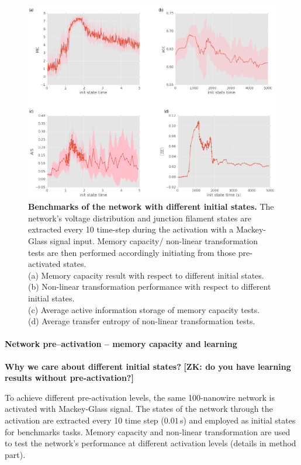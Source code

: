 \documentclass[fleqn,10pt,  reprint, amsmath,amssymb,aps, floatfix]{wlscirep}
\begin{document}
\begin{figure}[]
	\centering
	\includegraphics[width=1\linewidth]{figure/benchmark.png}
	\caption{\textbf{Benchmarks of the network with different initial states.} The network's voltage distribution and junction filament states are extracted every 10 time-step during the activation with a Mackey-Glass signal input. Memory capacity/ non-linear transformation tests are then performed accordingly initiating from those pre-activated states. \\
	(a) Memory capacity result with respect to different initial states.\\
	(b) Non-linear transformation performance with respect to different initial states.\\
	(c) Average active information storage of memory capacity tests.\\
	(d) Average transfer entropy of non-linear transformation tests.} 
	\label{fig:benchmark}
\end{figure}

\paragraph{Network pre--activation -- memory capacity and learning}

\textbf{Why we care about different initial states?} 
\textbf{[ZK: do you have learning results without pre-activation?]}


To achieve different pre-activation levels, the same 100-nanowire network is activated with Mackey-Glass signal. The states of the network through the activation are extracted every 10 time step ($0.01 \,$s) and employed as initial states for benchmarks tasks. Memory capacity and non-linear transformation are used to test the network's performance at different activation levels (details in method part). 
\end{document}
